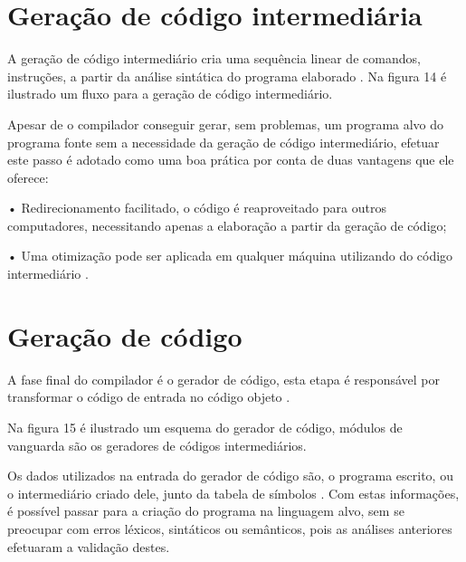 \documentclass[12pt,oneside,a4paper,chapter=TITLE,section=TITLE,sumario=tradicional]{abntex2}
\begin{document}
\section{Geração de código intermediária}
\label{sec:geracao-de-codigo-intermediaria}

A geração de código intermediário cria uma sequência linear de comandos, instruções, a partir da análise sintática do programa elaborado \cite{pedro2018}. Na figura 14 é ilustrado um fluxo para a geração de código intermediário.

\begin{figure}[H]
\end{figure}

Apesar de o compilador conseguir gerar, sem problemas, um programa alvo do programa fonte sem a necessidade da geração de código intermediário, efetuar este passo é adotado como uma boa prática por conta de duas vantagens que ele oferece:

•	Redirecionamento facilitado, o código é reaproveitado para outros computadores, necessitando apenas a elaboração a partir da geração de código;


•	Uma otimização pode ser aplicada em qualquer máquina utilizando do código intermediário \cite{alfred1995}.

\section{Geração de código}
\label{sec:geracao-de-codigo}

A fase final do compilador é o gerador de código, esta etapa é responsável por transformar o código de entrada no código objeto \cite{alfred1995}.

Na figura 15 é ilustrado um esquema do gerador de código, módulos de vanguarda são os geradores de códigos intermediários.

\begin{figure}[htb]
\end{figure}

Os dados utilizados na entrada do gerador de código são, o programa escrito, ou o intermediário criado dele, junto da tabela de símbolos \cite{alfred1995}. Com estas informações, é possível passar para a criação do programa na linguagem alvo, sem se preocupar com erros léxicos, sintáticos ou semânticos, pois as análises anteriores efetuaram a validação destes.
\end{document}
